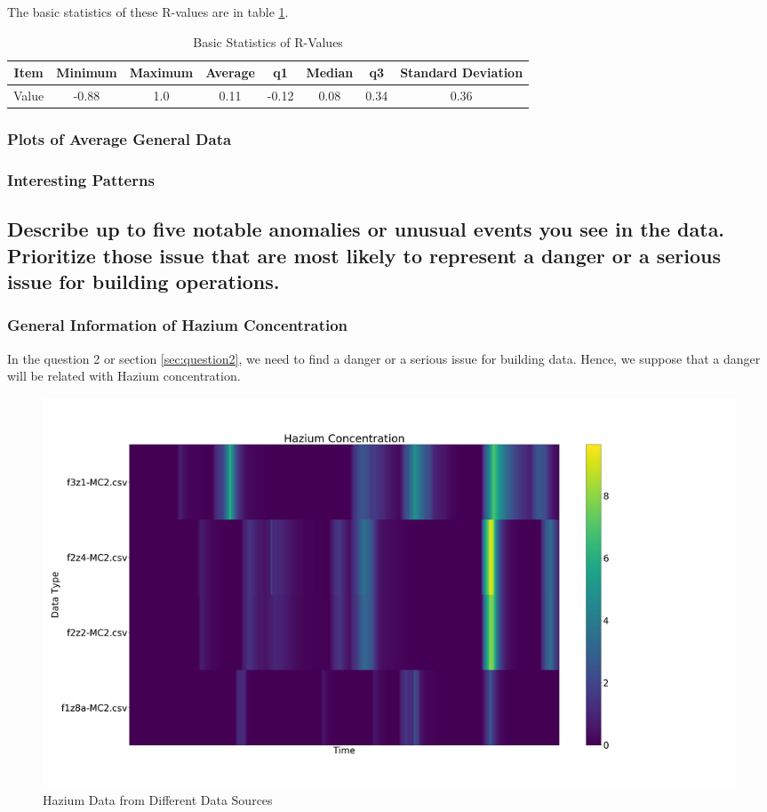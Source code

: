 \documentclass[aps, 10pt, a4paper]{article}
\begin{document}
                The basic statistics of these R-values are in table \ref{tb:rgeneral}.
                
                \begin{table}[htbp]
                    \caption{Basic Statistics of R-Values}
                    \label{tb:rgeneral}
                    \begin{tabular}{c||c|c|c|c|c|c|c}
                        Item & Minimum & Maximum & Average & q1 & Median & q3 & Standard Deviation \\ \hline
                        Value & -0.88 & 1.0 & 0.11 & -0.12 & 0.08 & 0.34 & 0.36 \\
                    \end{tabular}
                \end{table}
                
            \subsubsection{Plots of Average General Data}
            
            \subsubsection{Interesting Patterns}
        
        \subsection[Question 3]{Describe up to five notable anomalies or unusual events you see in the data. Prioritize those issue that are most likely to represent a danger or a serious issue for building operations.}
            \label{sec:question3}
            \subsubsection{General Information of Hazium Concentration}
                In the question 2 or section \ref{sec:question2}, we need to find a danger or a serious issue for building data. Hence, we suppose that a danger will be related with Hazium concentration.
                
                \begin{figure}[htbp]
                    \centering
                    \includegraphics[width=0.4 \linewidth]{figures/hazium.png}
                    \caption{Hazium Data from Different Data Sources}
                    \label{fig:generalhazium}
                \end{figure}
            
\end{document}

